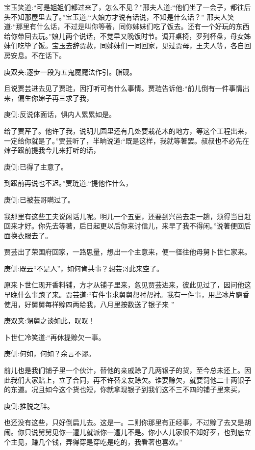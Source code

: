 \begin{parag}
    宝玉笑道:“可是姐姐们都过来了，怎么不见？”邢夫人道:“他们坐了一会子，都往后头不知那屋里去了。”宝玉道:“大娘方才说有话说，不知是什么话？” 邢夫人笑道:“那里有什么话，不过是叫你等著，同你姊妹们吃了饭去。还有一个好玩的东西给你带回去玩。”娘儿两个说话，不觉早又晚饭时节。调开桌椅，罗列杯盘，母女姊妹们吃毕了饭。宝玉去辞贾赦，同姊妹们一同回家，见过贾母，王夫人等，各自回房安息。不在话下。\begin{note}庚双夹:逐步一段为五鬼魇魔法作引。脂砚。\end{note}
\end{parag}


\begin{parag}
    且说贾芸进去见了贾琏，因打听可有什么事情。贾琏告诉他:“前儿倒有一件事情出来，偏生你婶子再三求了我，\begin{note}庚侧:反说体面话，惧内人累累如是。\end{note}给了贾芹了。他许了我，说明儿园里还有几处要栽花木的地方，等这个工程出来，一定给你就是了。”贾芸听了，半晌说道:“既是这样，我就等著罢。叔叔也不必先在婶子跟前提我今儿来打听的话，\begin{note}庚侧:已得了主意了。\end{note}到跟前再说也不迟。”贾琏道:“提他作什么，\begin{note}庚侧:已被芸哥瞒过了。\end{note}我那里有这些工夫说闲话儿呢。明儿一个五更，还要到兴邑去走一趟，须得当日赶回来才好。你先去等著，后日起更以后你来讨信儿，来早了我不得闲。”说著便回后面换衣服去了。
\end{parag}


\begin{parag}
    贾芸出了荣国府回家，一路思量，想出一个主意来，便一径往他母舅卜世仁家来。\begin{note}庚侧:既云“不是人”，如何肯共事？想芸哥此来空了。\end{note}原来卜世仁现开香料铺，方才从铺子里来，忽见贾芸进来，彼此见过了，因问他这早晚什么事跑了来。贾芸道:“有件事求舅舅帮衬帮衬。我有一件事，用些冰片麝香使用，好舅舅每样赊四两给我，八月里按数送了银子来 ”\begin{note}庚双夹:甥舅之谈如此，叹叹！\end{note}卜世仁冷笑道:“再休提赊欠一事。\begin{note}庚侧:何如，何如？余言不谬。\end{note}前儿也是我们铺子里一个伙计，替他的亲戚赊了几两银子的货，至今总未还上。因此我们大家赔上，立了合同，再不许替亲友赊欠。谁要赊欠，就要罚他二十两银子的东道。况且如今这个货也短，你就拿现银子到我们这不三不四的铺子里来买，\begin{note}庚侧:推脱之辞。\end{note}也还没有这些，只好倒扁儿去。这是一。二则你那里有正经事，不过赊了去又是胡闹。你只说舅舅见你一遭儿就派你一遭儿不是。你小人儿家很不知好歹，也到底立个主见，赚几个钱，弄得穿是穿吃是吃的，我看著也喜欢。”
\end{parag}


